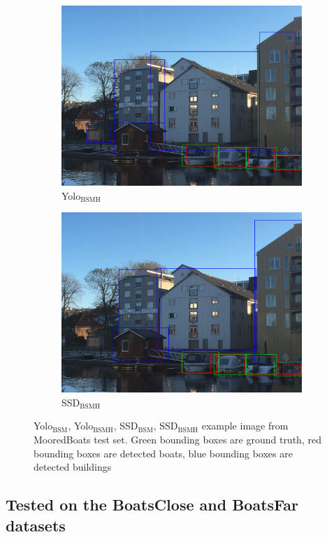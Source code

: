 \begin{figure}[h!]
\begin{subfigure}{.5\textwidth}
  \centering
  \includegraphics[width=0.8\linewidth]{results/case_buildings/prec_recall/yolo/IMG_2077_build.jpg}
  \caption{Yolo$_{\text{BSMH}}$}
  \label{fig:ex_bbnb_yolo3}
\end{subfigure}%
\begin{subfigure}{.5\textwidth}
  \centering
  \includegraphics[width=.8\linewidth]{results/case_buildings/prec_recall/ssd/IMG_2077_build.jpg}
  \caption{SSD$_{\text{BSMH}}$}
  \label{fig:ex_bbnb_ssd3}
\end{subfigure}
\caption{Yolo$_{\text{BSM}}$, Yolo$_{\text{BSMH}}$, SSD$_{\text{BSM}}$, SSD$_{\text{BSMH}}$ example image from MooredBoats test set. Green bounding boxes are ground truth, red bounding boxes are detected boats, blue bounding boxes are detected buildings}
\label{img:bbnb_ex}
\end{figure}

\newpage

\subsection{Tested on the BoatsClose and BoatsFar datasets}

